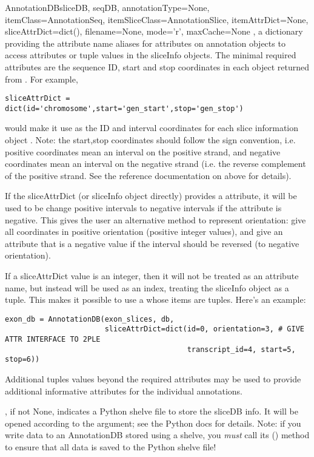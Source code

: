 \documentclass{howto}
\begin{document}
\begin{funcdesc}{AnnotationDB}{sliceDB, seqDB, annotationType=None, itemClass=AnnotationSeq, itemSliceClass=AnnotationSlice, itemAttrDict=None, sliceAttrDict=dict(), filename=None, mode='r', maxCache=None}
  , a dictionary providing the attribute name aliases
  for attributes on annotation objects to access attributes or tuple values
  in the sliceInfo objects.  The minimal required attributes are the
  sequence ID, start and stop coordinates in each object returned from .
  For example,
\begin{verbatim}
sliceAttrDict = dict(id='chromosome',start='gen_start',stop='gen_stop')
\end{verbatim}
  would make it use  as the ID and interval
  coordinates for each slice information object .  Note: the start,stop
  coordinates should follow the  sign convention, i.e. positive
  coordinates mean an interval on the positive strand, and negative coordinates
  mean an interval on the negative strand (i.e. the reverse complement of
  the positive strand.  See the reference documentation on  above
  for details).

  If the sliceAttrDict (or sliceInfo object directly) provides a 
  attribute, it will be used to be change positive intervals to negative intervals
  if the  attribute is negative.  This gives the user an alternative
  method to represent orientation: give all coordinates in positive orientation
  (positive integer values), and give an  attribute that
  is a negative value if the interval should be reversed (to negative orientation).

  If a sliceAttrDict value is an integer, then it will not be treated as an
  attribute name, but instead will be used as an index, treating the sliceInfo
  object as a tuple.  This makes it possible to use a  whose
  items are tuples.  Here's an example:
\begin{verbatim}
exon_db = AnnotationDB(exon_slices, db,
                       sliceAttrDict=dict(id=0, orientation=3, # GIVE ATTR INTERFACE TO 2PLE
                                          transcript_id=4, start=5, stop=6))
\end{verbatim}
  Additional tuples values beyond the required 
  attributes may be used to provide additional informative attributes
  for the individual annotations.

  , if not None, indicates a Python shelve file to store the
  sliceDB info.  It will be opened according to the  argument; 
  see the Python  docs for details.  Note: if you write data
  to an AnnotationDB stored using a shelve, you {\em must} call its
  () method to ensure that all data is saved to the Python
  shelve file!


\end{funcdesc}
\end{document}
